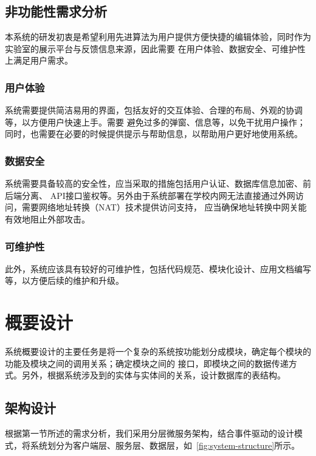 \subsection{非功能性需求分析}

本系统的研发初衷是希望利用先进算法为用户提供方便快捷的编辑体验，同时作为实验室的展示平台与反馈信息来源，因此需要
在用户体验、数据安全、可维护性上满足用户需求。

\subsubsection{用户体验}

系统需要提供简洁易用的界面，包括友好的交互体验、合理的布局、外观的协调等，以方便用户快速上手。需要
避免过多的弹窗、信息等，以免干扰用户操作；同时，也需要在必要的时候提供提示与帮助信息，以帮助用户更好地使用系统。

\subsubsection{数据安全}

系统需要具备较高的安全性，应当采取的措施包括用户认证、数据库信息加密、前后端分离、
API接口鉴权等。另外由于系统部署在学校内网无法直接通过外网访问，需要网络地址转换（NAT）\cite{egevang1994ip}技术提供访问支持，
应当确保地址转换中网关能有效地阻止外部攻击。

\subsubsection{可维护性}
此外，系统应该具有较好的可维护性，包括代码规范、模块化设计、应用文档编写等，以方便后续的维护和升级。

\section{概要设计}

系统概要设计的主要任务是将一个复杂的系统按功能划分成模块，确定每个模块的功能及模块之间的调用关系；确定模块之间的
接口，即模块之间的数据传递方式。另外，根据系统涉及到的实体与实体间的关系，设计数据库的表结构。

\subsection{架构设计}

根据第一节所述的需求分析，我们采用分层微服务架构，结合事件驱动的设计模式，将系统划分为客户端层、服务层、数据层，如~\ref{fig:system-structure}所示。

